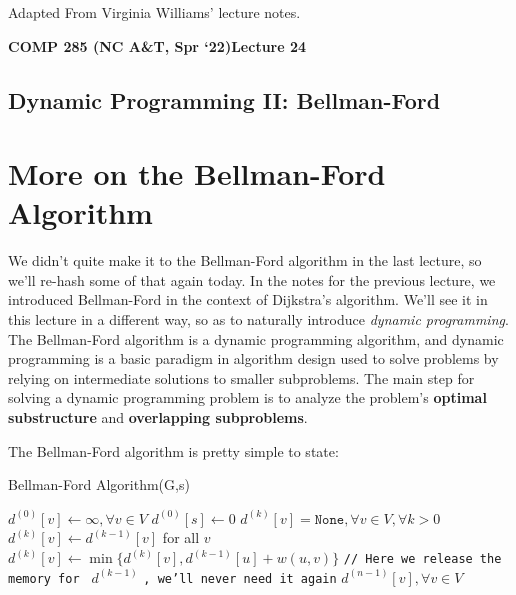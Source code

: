 \documentclass [12pt]{article}
\theoremstyle{definition}
\begin{document}
 

\vspace {1em} 
\begin {Instruction} 
Adapted From Virginia Williams' lecture notes.
\end {Instruction}  

{\LARGE \textbf {COMP 285 (NC A\&T, Spr `22)}\hfill \textbf {Lecture 24} } 

\begin{centering}
\section*{Dynamic Programming II: Bellman-Ford}
\end{centering}


\section{More on the Bellman-Ford Algorithm}
 
We didn't quite make it to the Bellman-Ford algorithm in the last lecture, so we'll re-hash some of that again today. In the notes for the previous lecture, we introduced Bellman-Ford in the context of Dijkstra's algorithm. We'll see it in this lecture in a different way, so as to naturally introduce \textit{dynamic programming}. The Bellman-Ford algorithm is a dynamic programming algorithm, and dynamic programming is a basic paradigm in algorithm design used to solve problems by relying on intermediate solutions to smaller subproblems. The main step for solving a dynamic programming problem is to analyze the problem's \textbf{optimal substructure} and \textbf{overlapping subproblems}. 

The Bellman-Ford algorithm is pretty simple to state:

\begin{algorithm}
\caption{Bellman-Ford Algorithm(G,s)}
\label{alg:bellman-ford}
\begin{algorithmic}
\STATE $d^{(0)}[v] \gets \infty, \forall v \in V$
\STATE $d^{(0)}[s] \gets 0$
\STATE $d^{(k)}[v] = \texttt{None}, \forall v \in V, \forall k > 0$
  \STATE $d^{(k)}[v] \gets d^{(k-1)}[v]$ for all $v$
    \STATE $d^{(k)}[v] \gets \min\{d^{(k)}[v], d^{(k-1)}[u] + w(u,v) \}$ 
  \ENDFOR
  \STATE \texttt{// Here we release the memory for } $d^{(k-1)}$ \texttt{, we'll never need it again}
\ENDFOR
\RETURN $d^{(n-1)}[v], \forall v \in V$
\end{algorithmic}
\end{algorithm}
\end{document}
